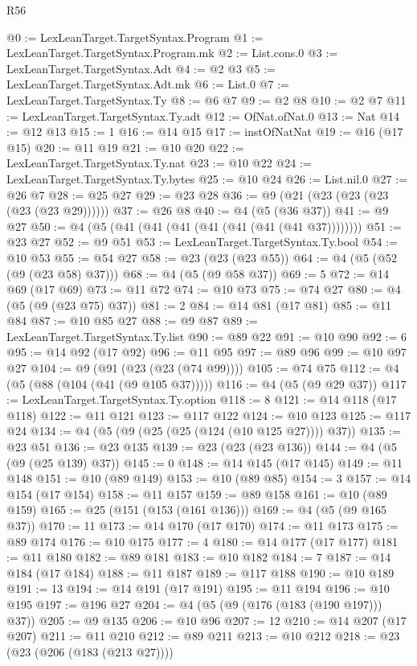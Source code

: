 \begin{lexlean}{R56}
\begin{coremodule}
@0 := LexLeanTarget.TargetSyntax.Program
@1 := LexLeanTarget.TargetSyntax.Program.mk
@2 := List.cons.{0}
@3 := LexLeanTarget.TargetSyntax.Adt
@4 := @2 @3
@5 := LexLeanTarget.TargetSyntax.Adt.mk
@6 := List.{0}
@7 := LexLeanTarget.TargetSyntax.Ty
@8 := @6 @7
@9 := @2 @8
@10 := @2 @7
@11 := LexLeanTarget.TargetSyntax.Ty.adt
@12 := OfNat.ofNat.{0}
@13 := Nat
@14 := @12 @13
@15 := 1
@16 := @14 @15
@17 := instOfNatNat
@19 := @16 (@17 @15)
@20 := @11 @19
@21 := @10 @20
@22 := LexLeanTarget.TargetSyntax.Ty.nat
@23 := @10 @22
@24 := LexLeanTarget.TargetSyntax.Ty.bytes
@25 := @10 @24
@26 := List.nil.{0}
@27 := @26 @7
@28 := @25 @27
@29 := @23 @28
@36 := @9 (@21 (@23 (@23 (@23 (@23 (@23 @29))))))
@37 := @26 @8
@40 := @4 (@5 (@36 @37))
@41 := @9 @27
@50 := @4 (@5 (@41 (@41 (@41 (@41 (@41 (@41 (@41 @37))))))))
@51 := @23 @27
@52 := @9 @51
@53 := LexLeanTarget.TargetSyntax.Ty.bool
@54 := @10 @53
@55 := @54 @27
@58 := @23 (@23 (@23 @55))
@64 := @4 (@5 (@52 (@9 (@23 @58) @37)))
@68 := @4 (@5 (@9 @58 @37))
@69 := 5
@72 := @14 @69 (@17 @69)
@73 := @11 @72
@74 := @10 @73
@75 := @74 @27
@80 := @4 (@5 (@9 (@23 @75) @37))
@81 := 2
@84 := @14 @81 (@17 @81)
@85 := @11 @84
@87 := @10 @85 @27
@88 := @9 @87
@89 := LexLeanTarget.TargetSyntax.Ty.list
@90 := @89 @22
@91 := @10 @90
@92 := 6
@95 := @14 @92 (@17 @92)
@96 := @11 @95
@97 := @89 @96
@99 := @10 @97 @27
@104 := @9 (@91 (@23 (@23 (@74 @99))))
@105 := @74 @75
@112 := @4 (@5 (@88 (@104 (@41 (@9 @105 @37)))))
@116 := @4 (@5 (@9 @29 @37))
@117 := LexLeanTarget.TargetSyntax.Ty.option
@118 := 8
@121 := @14 @118 (@17 @118)
@122 := @11 @121
@123 := @117 @122
@124 := @10 @123
@125 := @117 @24
@134 := @4 (@5 (@9 (@25 (@25 (@124 (@10 @125 @27)))) @37))
@135 := @23 @51
@136 := @23 @135
@139 := @23 (@23 (@23 @136))
@144 := @4 (@5 (@9 (@25 @139) @37))
@145 := 0
@148 := @14 @145 (@17 @145)
@149 := @11 @148
@151 := @10 (@89 @149)
@153 := @10 (@89 @85)
@154 := 3
@157 := @14 @154 (@17 @154)
@158 := @11 @157
@159 := @89 @158
@161 := @10 (@89 @159)
@165 := @25 (@151 (@153 (@161 @136)))
@169 := @4 (@5 (@9 @165 @37))
@170 := 11
@173 := @14 @170 (@17 @170)
@174 := @11 @173
@175 := @89 @174
@176 := @10 @175
@177 := 4
@180 := @14 @177 (@17 @177)
@181 := @11 @180
@182 := @89 @181
@183 := @10 @182
@184 := 7
@187 := @14 @184 (@17 @184)
@188 := @11 @187
@189 := @117 @188
@190 := @10 @189
@191 := 13
@194 := @14 @191 (@17 @191)
@195 := @11 @194
@196 := @10 @195
@197 := @196 @27
@204 := @4 (@5 (@9 (@176 (@183 (@190 @197))) @37))
@205 := @9 @135
@206 := @10 @96
@207 := 12
@210 := @14 @207 (@17 @207)
@211 := @11 @210
@212 := @89 @211
@213 := @10 @212
@218 := @23 (@23 (@206 (@183 (@213 @27))))

\end{coremodule}
\end{lexlean}
